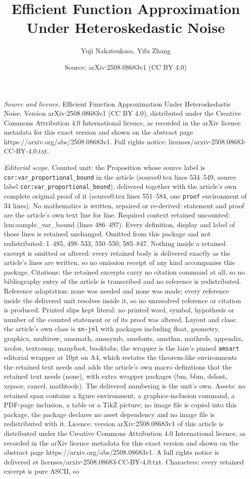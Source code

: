 \documentclass[10pt,a4paper]{amsart}
\title[Efficient Function Approximation Under Heteroskedastic Noise]{Efficient Function Approximation Under Heteroskedastic Noise}
\author{Yuji Nakatsukasa, Yifu Zhang}
\date{Source: arXiv:2508.08683v1 (CC BY 4.0)}
\begin{document}
\maketitle

\noindent\emph{Source and licence.} Efficient Function Approximation Under Heteroskedastic Noise. Version arXiv:2508.08683v1 (CC BY 4.0), distributed under the Creative Commons Attribution 4.0 International licence, as recorded in the arXiv licence metadata for this exact version and shown on the abstract page https://arxiv.org/abs/2508.08683v1. Full rights notice: licenses/arxiv-2508.08683-CC-BY-4.0.txt.\par\smallskip

\noindent\textit{Editorial scope.} Counted unit: the Proposition whose source label is \texttt{cor:var\_proportional\_bound} in the article (source0.tex lines 534--549, source label \texttt{cor:var\_proportional\_bound}), delivered together with the article's own complete original proof of it (source0.tex lines 551--584, one \texttt{proof} environment of 34 lines). No mathematics is written, repaired or re-derived: statement and proof are the article's own text line for line. Required context retained uncounted: lem:sample\_var\_bound (lines 486--497). Every definition, display and label of those lines is retained unchanged. Omitted from this package and not redistributed: 1--485, 498--533, 550--550, 585--847. Nothing inside a retained excerpt is omitted or altered: every retained body is delivered exactly as the article's lines are written, so no omission receipt of any kind accompanies this package. Citations: the retained excerpts carry no citation command at all, so no bibliography entry of the article is transcribed and no reference is redistributed. Reference adaptation: none was needed and none was made; every reference inside the delivered unit resolves inside it, so no unresolved reference or citation is produced. Printed slips kept literal: no printed word, symbol, hypothesis or number of the counted statement or of its proof was altered. Layout and class: the article's own class is \texttt{sn-jnl} with packages including float, geometry, graphicx, multirow, amsmath, amssymb, amsfonts, amsthm, mathrsfs, appendix, xcolor, textcomp, manyfoot, booktabs; the wrapper is the lane's pinned \texttt{amsart} editorial wrapper at 10pt on A4, which restates the theorem-like environments the retained text needs and adds the article's own macro definitions that the retained text needs (none), with extra wrapper packages (bm, bbm, dsfont, xspace, cancel, mathtools). The delivered numbering is the unit's own. Assets: no retained span contains a figure environment, a graphics-inclusion command, a PDF-page inclusion, a table or a TikZ picture; no image file is copied into this package, the package declares no asset dependency and no image file is redistributed with it. Licence: version arXiv:2508.08683v1 of this article is distributed under the Creative Commons Attribution 4.0 International licence, as recorded in the arXiv licence metadata for this exact version and shown on the abstract page https://arxiv.org/abs/2508.08683v1. A full rights notice is delivered at licenses/arxiv-2508.08683-CC-BY-4.0.txt. Characters: every retained excerpt is pure ASCII, so 
\end{document}
